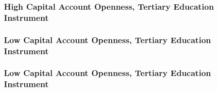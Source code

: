 \documentclass{beamer}
\begin{document}
    \begin{frame}
        \frametitle{High Capital Account Openness, Tertiary Education Instrument}
        {
            \let\oldcentering\centering
            \renewcommand\centering{\tiny\oldcentering}
            
        }
    \end{frame}

    \begin{frame}
        \frametitle{Low Capital Account Openness, Tertiary Education Instrument}
        {
            \let\oldcentering\centering
            \renewcommand\centering{\tiny\oldcentering}
            
        }
    \end{frame}

    \begin{frame}
        \frametitle{Low Capital Account Openness, Tertiary Education Instrument}
        {
            \let\oldcentering\centering
            \renewcommand\centering{\tiny\oldcentering}
            
        }
    \end{frame}
\end{document}
